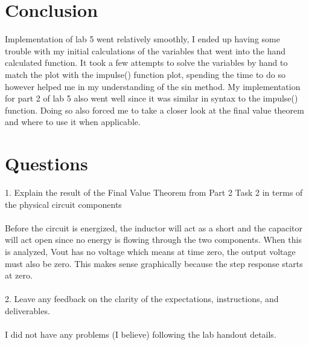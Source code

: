 \documentclass[12pt]{report}
\begin{document}
\section{Conclusion}
\hspace{\parindent}Implementation of lab 5 went relatively smoothly, I ended up having some trouble with my initial calculations of the variables that went into the hand calculated function. It took a few attempts to solve the variables by hand to match the plot with the impulse() function plot, spending the time to do so however helped me in my understanding of the sin method. My implementation for part 2 of lab 5 also went well since it was similar in syntax to the impulse() function. Doing so also forced me to take a closer look at the final value theorem and where to use it when applicable.

\section{Questions}
1. Explain the result of the Final Value Theorem from Part 2 Task 2 in terms of the physical circuit components\\\\
Before the circuit is energized, the inductor will act as a short and the capacitor will act open since no energy is flowing through the two components. When this is analyzed, Vout has no voltage which means at time zero, the output voltage must also be zero. This makes sense graphically because the step response starts at zero.\\\\
2. Leave any feedback on the clarity of the expectations, instructions, and deliverables.\\\\
I did not have any problems (I believe) following the lab handout details.
\end{document}
